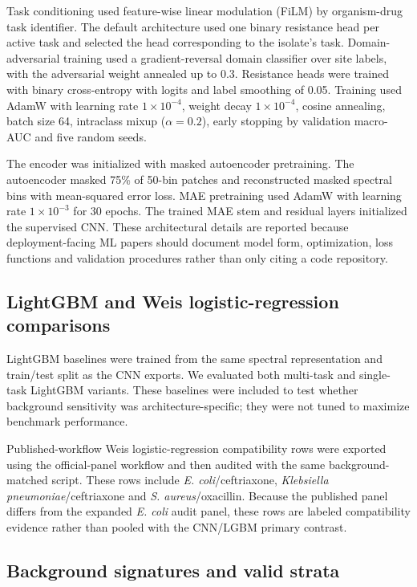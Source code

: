 \documentclass[11pt]{article}
\begin{document}
Task conditioning used feature-wise linear modulation (FiLM) by organism-drug task identifier. The default architecture used one binary resistance head per active task and selected the head corresponding to the isolate's task. Domain-adversarial training used a gradient-reversal domain classifier over site labels, with the adversarial weight annealed up to 0.3. Resistance heads were trained with binary cross-entropy with logits and label smoothing of 0.05. Training used AdamW with learning rate $1\times10^{-4}$, weight decay $1\times10^{-4}$, cosine annealing, batch size 64, intraclass mixup ($\alpha=0.2$), early stopping by validation macro-AUC and five random seeds.

The encoder was initialized with masked autoencoder pretraining. The autoencoder masked 75\% of 50-bin patches and reconstructed masked spectral bins with mean-squared error loss. MAE pretraining used AdamW with learning rate $1\times10^{-3}$ for 30 epochs. The trained MAE stem and residual layers initialized the supervised CNN. These architectural details are reported because deployment-facing ML papers should document model form, optimization, loss functions and validation procedures rather than only citing a code repository\cite{tripodAI2024,probast2019}.

\subsection*{LightGBM and Weis logistic-regression comparisons}

LightGBM baselines were trained from the same spectral representation and train/test split as the CNN exports. We evaluated both multi-task and single-task LightGBM variants. These baselines were included to test whether background sensitivity was architecture-specific; they were not tuned to maximize benchmark performance.

Published-workflow Weis logistic-regression compatibility rows were exported using the official-panel workflow and then audited with the same background-matched script. These rows include \textit{E. coli}/ceftriaxone, \textit{Klebsiella pneumoniae}/ceftriaxone and \textit{S. aureus}/oxacillin. Because the published panel differs from the expanded \textit{E. coli} audit panel, these rows are labeled compatibility evidence rather than pooled with the CNN/LGBM primary contrast.

\subsection*{Background signatures and valid strata}
\end{document}
